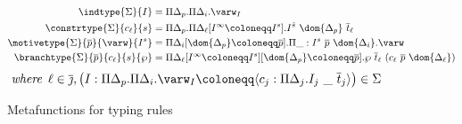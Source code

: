 \begin{figure}
\centering
\begin{align*}
    \indtype{\Sigma}{I} &=
        \Pi \Delta_p . \Pi \Delta_i . \varw_I \\
    \constrtype{\Sigma}{c_\ell}{s} &=
        \Pi \Delta_p . \Pi \Delta_\ell [I^\infty \coloneqq I^s] . I^{\hat{s}} ~ \dom{\Delta_p} ~ \overline{t}_\ell \\
    \motivetype{\Sigma}{\overline{p}}{\varw}{I^s} &=
        \Pi \Delta_i[\dom{\Delta_p} \coloneqq \overline{p}] . \Pi \_ : I^s ~ \overline{p} ~ \dom{\Delta_i} . \varw \\
    \branchtype{\Sigma}{\overline{p}}{c_\ell}{s}{\wp} &=
        \Pi \Delta_\ell [I^\infty \coloneqq I^s][\dom{\Delta_p} \coloneqq \overline{p}] . \wp ~ \overline{t}_\ell ~ (c_\ell ~ \overline{p} ~ \dom{\Delta_\ell})
\end{align*}
\begin{displaymath}
    \textit{where}\;\:
    \ell \in \overline{\jmath},
    \big(I: \Pi\Delta_p . \Pi\Delta_i . \varw_I \coloneqq \langle c_j : \Pi \Delta_j . I_j ~ \_ ~ \overline{t}_j \rangle \big) \in \Sigma
\end{displaymath}
\caption{Metafunctions for typing rules}
\label{fig:simpl-metafunctions}
\end{figure}


